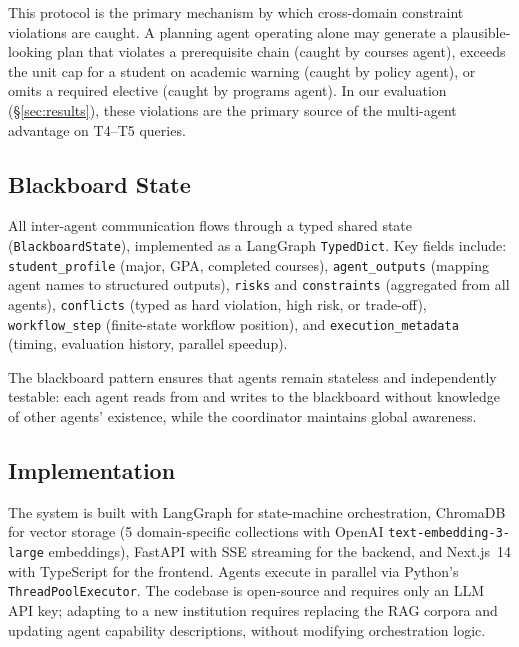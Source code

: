 This protocol is the primary mechanism by which cross-domain constraint violations are caught. A planning agent operating alone may generate a plausible-looking plan that violates a prerequisite chain (caught by courses agent), exceeds the unit cap for a student on academic warning (caught by policy agent), or omits a required elective (caught by programs agent). In our evaluation (\S\ref{sec:results}), these violations are the primary source of the multi-agent advantage on T4--T5 queries.


\subsection{Blackboard State}

All inter-agent communication flows through a typed shared state (\texttt{BlackboardState}), implemented as a LangGraph \texttt{TypedDict}. Key fields include: \texttt{student\_profile} (major, GPA, completed courses), \texttt{agent\_outputs} (mapping agent names to structured outputs), \texttt{risks} and \texttt{constraints} (aggregated from all agents), \texttt{conflicts} (typed as hard violation, high risk, or trade-off), \texttt{workflow\_step} (finite-state workflow position), and \texttt{execution\_metadata} (timing, evaluation history, parallel speedup).

The blackboard pattern ensures that agents remain stateless and independently testable: each agent reads from and writes to the blackboard without knowledge of other agents' existence, while the coordinator maintains global awareness.


\subsection{Implementation}

The system is built with LangGraph for state-machine orchestration, ChromaDB for vector storage (5 domain-specific collections with OpenAI \texttt{text-embedding-3-large} embeddings), FastAPI with SSE streaming for the backend, and Next.js~14 with TypeScript for the frontend. Agents execute in parallel via Python's \texttt{ThreadPoolExecutor}. The codebase is open-source and requires only an LLM API key; adapting to a new institution requires replacing the RAG corpora and updating agent capability descriptions, without modifying orchestration logic.



